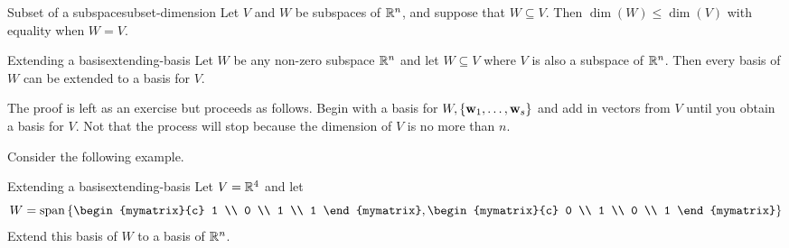 \begin{theorem}{Subset of a subspace}{subset-dimension}
  Let $V$ and $W$ be subspaces of\/ $\mathbb{R}^n$, and suppose that
  $W\subseteq V$.  Then $\dim(W) \leq \dim(V)$ with equality when
  $W=V$.
\end{theorem}

\begin{theorem}{Extending a basis}{extending-basis}
  Let $W$ be any non-zero subspace $\mathbb{R}^{n}$ and let $W\subseteq V$
  where $V$ is also a subspace of\/ $\mathbb{R}^{n}$. Then every basis of $W$
  can be extended to a basis for $V$.
\end{theorem}

The proof is left as an exercise but proceeds as follows. Begin with a
basis for $W,\left\{\mbox{\bf w}_{1},\ldots ,\mbox{\bf w}_{s}\right\} $ and add in
vectors from $V$ until you obtain a basis for $V$.  Not that the
process will stop because the dimension of $V$ is no more than $n$.

Consider the following example.

\begin{example}{Extending a basis}{extending-basis}
  Let $V=\mathbb{R}^{4}$ and let 
  \begin{equation*}
    W=\sspan\set{
      \begin{mymatrix}{c} 1 \\ 0 \\ 1 \\ 1 \end{mymatrix},
      \begin{mymatrix}{c} 0 \\ 1 \\ 0 \\ 1 \end{mymatrix}
    }
  \end{equation*}
  Extend this basis of $W$ to a basis of\/ $\mathbb{R}^{n}$.
\end{example}

